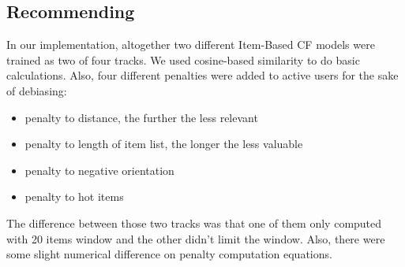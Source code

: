 \documentclass[manuscript,noacm]{acmart}
\begin{document}
\subsection{Recommending}
In our implementation, altogether two different Item-Based CF models were trained as two of four tracks. We used cosine-based similarity to do basic calculations. Also, four different penalties were added to active users for the sake of debiasing:
\begin{itemize}
    \item penalty to distance, the further the less relevant
    \item penalty to length of item list, the longer the less valuable
    \item penalty to negative orientation
    \item penalty to hot items
\end{itemize}

The difference between those two tracks was that one of them only computed with 20 items window and the other didn't limit the window. Also, there were some slight numerical difference on penalty computation equations.
\end{document}
